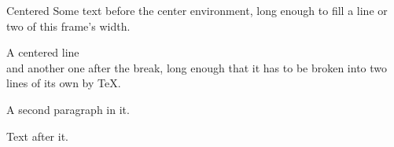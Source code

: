 \documentclass{beamer}
\begin{document}
\begin{frame}{Centered}
Some text before the center environment, long enough to fill a line or two of this frame's width.
\begin{center}
A centered line\\
and another one after the break, long enough that it has to be broken into two lines of its own by TeX.

A second paragraph in it.
\end{center}
Text after it.
\end{frame}
\end{document}
